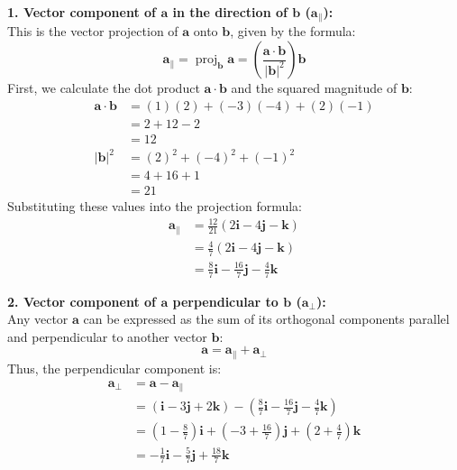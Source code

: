 \documentclass[12pt,a4paper]{article}
\begin{document}
\begin{enumerate}
\begin{tcolorbox}[enhanced,breakable,ansbox,colback=cD!4,colframe=cD,boxrule=0.8pt,arc=5pt,title={\textbf{Answer}},fonttitle=\bfseries\color{white},colbacktitle=cD]
\textbf{1. Vector component of $\mathbf{a}$ in the direction of $\mathbf{b}$ ($\mathbf{a}_{\parallel}$):} \\
This is the vector projection of $\mathbf{a}$ onto $\mathbf{b}$, given by the formula:
\[ \mathbf{a}_{\parallel} = \operatorname{proj}_{\mathbf{b}}\mathbf{a} = \left( \frac{\mathbf{a} \cdot \mathbf{b}}{|\mathbf{b}|^2} \right) \mathbf{b} \]
First, we calculate the dot product $\mathbf{a} \cdot \mathbf{b}$ and the squared magnitude of $\mathbf{b}$:
\begin{align*}
    \mathbf{a} \cdot \mathbf{b} &= (1)(2) + (-3)(-4) + (2)(-1) \\
    &= 2 + 12 - 2 \\
    &= 12 \\[1em]
    |\mathbf{b}|^2 &= (2)^2 + (-4)^2 + (-1)^2 \\
    &= 4 + 16 + 1 \\
    &= 21
\end{align*}
Substituting these values into the projection formula:
\begin{align*}
    \mathbf{a}_{\parallel} &= \frac{12}{21} (2\mathbf{i} - 4\mathbf{j} - \mathbf{k}) \\
    &= \frac{4}{7} (2\mathbf{i} - 4\mathbf{j} - \mathbf{k}) \\
    &= \boxed{\frac{8}{7}\mathbf{i} - \frac{16}{7}\mathbf{j} - \frac{4}{7}\mathbf{k}}
\end{align*}

\vspace{1em}
\textbf{2. Vector component of $\mathbf{a}$ perpendicular to $\mathbf{b}$ ($\mathbf{a}_{\perp}$):} \\
Any vector $\mathbf{a}$ can be expressed as the sum of its orthogonal components parallel and perpendicular to another vector $\mathbf{b}$: 
\[ \mathbf{a} = \mathbf{a}_{\parallel} + \mathbf{a}_{\perp} \]
Thus, the perpendicular component is:
\begin{align*}
    \mathbf{a}_{\perp} &= \mathbf{a} - \mathbf{a}_{\parallel} \\[1ex]
    &= (\mathbf{i} - 3\mathbf{j} + 2\mathbf{k}) - \left(\frac{8}{7}\mathbf{i} - \frac{16}{7}\mathbf{j} - \frac{4}{7}\mathbf{k}\right) \\[1ex]
    &= \left(1 - \frac{8}{7}\right)\mathbf{i} + \left(-3 + \frac{16}{7}\right)\mathbf{j} + \left(2 + \frac{4}{7}\right)\mathbf{k} \\[1ex]
    &= \boxed{-\frac{1}{7}\mathbf{i} - \frac{5}{7}\mathbf{j} + \frac{18}{7}\mathbf{k}}
\end{align*}


\end{tcolorbox}
\end{enumerate}
\end{document}
